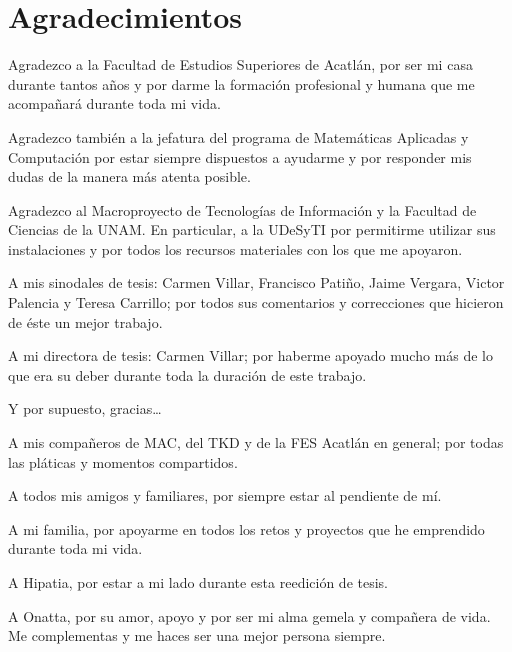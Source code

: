 \chapter*{Agradecimientos}

{\small
Agradezco a la Facultad de Estudios Superiores de Acatlán, por ser mi casa durante tantos años y por darme la formación profesional y humana que me acompañará durante toda mi vida.

Agradezco también a la jefatura del programa de Matemáticas Aplicadas y Computación por estar siempre dispuestos a ayudarme y por responder mis dudas de la manera más atenta posible.

Agradezco al Macroproyecto de Tecnologías de Información y la Facultad de Ciencias de la UNAM. En particular, a la UDeSyTI por permitirme utilizar sus instalaciones y por todos los recursos materiales con los que me apoyaron.

A mis sinodales de tesis: Carmen Villar, Francisco Patiño, Jaime Vergara, Victor Palencia y Teresa Carrillo; por todos sus comentarios y correcciones que hicieron de éste un mejor trabajo.

A mi directora de tesis: Carmen Villar; por haberme apoyado mucho más de lo que era su deber durante toda la duración de este trabajo.

Y por supuesto, gracias\ldots

A mis compañeros de MAC, del TKD y de la FES Acatlán en general; por todas las pláticas y momentos compartidos.

A todos mis amigos y familiares, por siempre estar al pendiente de mí.

A mi familia, por apoyarme en todos los retos y proyectos que he emprendido durante toda mi vida.

A Hipatia, por estar a mi lado durante esta reedición de tesis.

A Onatta, por su amor, apoyo y por ser mi alma gemela y compañera de vida. Me complementas y me haces ser una mejor persona siempre.

}
